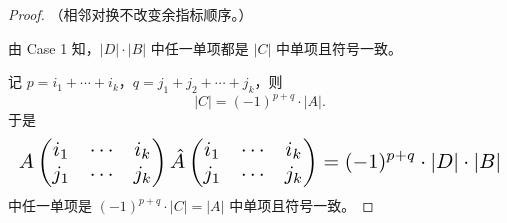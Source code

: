 \begin{proof}
（相邻对换不改变余指标顺序。）

由 Case 1 知，$|D|\cdot|B|$ 中任一单项都是 $|C|$ 中单项且符号一致。

记 $p=i_1+\cdots+i_k$，$q=j_1+j_2+\cdots+j_k$，则
\[
|C|=(-1)^{p+q}\cdot|A|.
\]
于是
\[
\resizebox{\linewidth}{!}{$\displaystyle
A\begin{pmatrix}i_1&\cdots&i_k\\j_1&\cdots&j_k\end{pmatrix}
\hat{A}\begin{pmatrix}i_1&\cdots&i_k\\j_1&\cdots&j_k\end{pmatrix}
=(-1)^{p+q}\cdot|D|\cdot|B|$}
\]
中任一单项是 $(-1)^{p+q}\cdot|C|=|A|$ 中单项且符号一致。
\end{proof}
